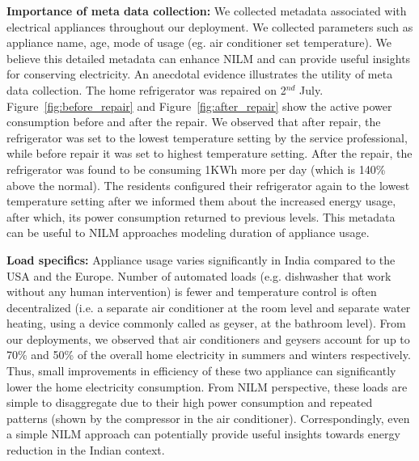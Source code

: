 \documentclass[10pt]{sensys-proc}
\newcommand{\redcolor}[1]{\textcolor{red}{#1}}
\newcommand{\figref}[1]{Figure~\ref{#1}}
\begin{document}
\noindent \textbf{Importance of meta data collection:} We collected metadata associated with electrical appliances throughout our deployment. We collected parameters such as appliance name, age, mode of usage (eg. air conditioner set temperature). We believe this detailed metadata can enhance NILM and can provide useful insights for conserving electricity. An anecdotal evidence illustrates the utility of meta data collection. The home refrigerator was repaired on 2$^{nd}$ July. \figref{fig:before_repair} and \figref{fig:after_repair} show the active power consumption before and after the repair. We observed that after repair, the refrigerator was set to the lowest temperature setting by the service professional, while before repair it was set to highest temperature setting. After the repair, the refrigerator was found to be consuming 1KWh more per day (which is 140\% above the normal). The residents configured their refrigerator again to the lowest temperature setting after we informed them about the increased energy usage, after which, its power consumption returned to previous levels. 
This metadata can be useful to NILM approaches modeling duration of appliance usage. 
%

\noindent \textbf{Load specifics:} Appliance usage varies significantly in India compared to the USA and the Europe. Number of automated loads (e.g. dishwasher that work without any human intervention) is fewer and temperature control is often decentralized (i.e. a separate air conditioner at the room level and separate water heating, using a device commonly called as geyser, at the bathroom level). From our deployments, we observed that air conditioners and geysers account for up to 70\% and 50\% of the overall home electricity in summers and winters respectively. Thus, small improvements in efficiency of these two appliance can significantly lower the home electricity consumption. From NILM perspective, these loads are simple to disaggregate due to their high power consumption and repeated patterns (shown by the compressor in the air conditioner). Correspondingly, even a simple NILM approach can potentially provide useful insights towards energy reduction in the Indian context.
\end{document}
